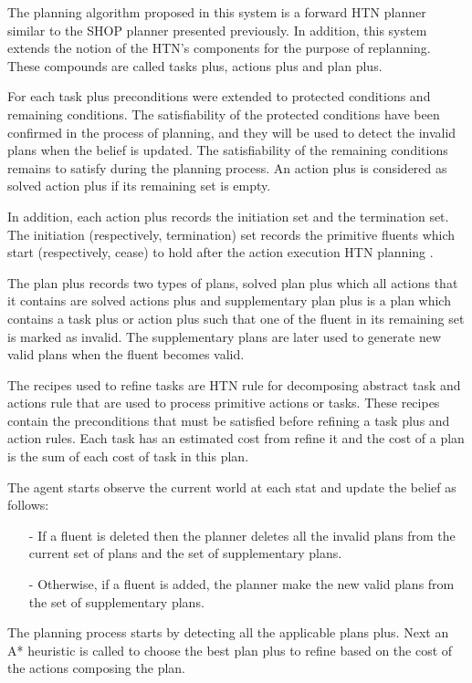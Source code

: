 The planning algorithm proposed in this system is a forward HTN planner similar to the SHOP planner presented previously. In addition, this system extends the notion of the HTN’s components for the purpose of replanning. These compounds are called tasks plus, actions plus and plan plus.

For each task plus preconditions were extended to protected conditions and remaining conditions. The satisfiability of the protected conditions have been confirmed in the process of planning, and they will be used to detect the invalid plans when the belief is updated. The satisfiability of the remaining conditions remains to satisfy during the planning process. An action plus is considered as solved action plus if its remaining set is empty. 

In addition, each action plus records the initiation set and the termination set. The initiation (respectively, termination) set records the primitive fluents which start (respectively, cease) to hold after the action execution HTN planning \cite{hayashi2006dynagent}. 

The plan plus records two types of plans, solved plan plus which all actions that it contains are solved actions plus and supplementary plan plus is a plan which contains a task plus or action plus such that one of the fluent in its remaining set is marked as invalid. The supplementary plans are later used to generate new valid plans when the fluent becomes valid. 

The recipes used to refine tasks are HTN rule for decomposing abstract task and actions rule that are used to process primitive actions or tasks. These recipes contain the preconditions that must be satisfied before refining a task plus and action rules. Each task has an estimated cost from refine it and the cost of a plan is the sum of each cost of task in this plan.

The agent starts observe the current world at each stat and update the belief as follows:
\begin{itemize}
\item[-]If a fluent is deleted then the planner deletes all the invalid plans from the current set of plans and the set of supplementary plans. 
\item[-]Otherwise, if a fluent is added, the planner make the new valid plans from the set of supplementary plans. 
\end{itemize}


The planning process starts by detecting all the applicable plans plus. Next an A* heuristic is called to choose the best plan plus to refine based on the cost of the actions composing the plan.

